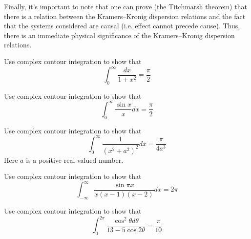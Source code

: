 Finally, it's important to note that one can prove (the Titchmarsh theorem) that
there is a relation between the Kramers--Kronig dispersion relations and the
fact that the systems considered are causal (i.e. effect cannot precede cause).
Thus, there is an immediate physical significance of the Kramers--Kronig
dispersion relations.


\begin{exer}
Use complex contour integration to show that
$$ \int_0^{\infty} \frac{dx}{1+x^2} = \frac{\pi}{2}$$
\end{exer}

\begin{exer}
Use complex contour integration to show that
$$ \int_0^{\infty} \frac{\sin x}{x} dx = \frac{\pi}{2}$$
\end{exer}

\begin{exer}
Use complex contour integration to show that
$$ \int_0^{\infty} \frac{1}{\left(x^2 + a^2\right)^2} dx = \frac{\pi}{4 a^3}$$
Here $a$ is a positive real-valued number.
\end{exer}

\begin{exer}
Use complex contour integration to show that
$$ \int_{-\infty}^{\infty} \frac{\sin \pi x}{x (x-1) (x-2)} dx = 2 \pi$$
\end{exer}

\begin{exer}
Use complex contour integration to show that
$$ \int_0^{2\pi} \frac{\cos^2 \theta d \theta}{13-5\cos 2 \theta} = \frac{\pi}{10}$$
\end{exer}

